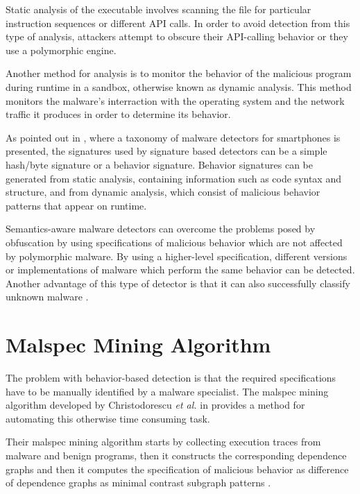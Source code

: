 Static analysis of the executable involves scanning the file for particular instruction sequences or different API calls. In order to avoid detection from this type of analysis, attackers attempt to obscure their API-calling behavior or they use a polymorphic engine.

Another method for analysis is to monitor the behavior of the malicious program during runtime in a sandbox, otherwise known as dynamic analysis. This method monitors the malware's interraction with the operating system and the network traffic it produces in order to determine its behavior.

As pointed out in \cite{smartphone-malware-detection}, where a taxonomy of malware detectors for smartphones is presented, the signatures used by signature based detectors can be a simple hash/byte signature or a behavior signature. Behavior signatures can be generated from static analysis, containing information such as code syntax and structure, and from dynamic analysis, which consist of malicious behavior patterns that appear on runtime.

Semantics-aware malware detectors can overcome the problems posed by obfuscation by using specifications of malicious behavior which are not affected by polymorphic malware. By using a higher-level specification, different versions or implementations of malware which perform the same behavior can be detected. Another advantage of this type of detector is that it can also successfully classify unknown malware \cite{semantics-based-detection}.

\section{Malspec Mining Algorithm}
\label{sec:malspec-alg}

The problem with behavior-based detection is that the required specifications have to be manually identified by a malware specialist. The malspec mining algorithm developed by Christodorescu \textit{et al.} in \cite{mining-specifications} provides a method for automating this otherwise time consuming task. 

Their malspec mining algorithm starts by collecting execution traces from malware and benign programs, then it constructs the corresponding dependence graphs and then it computes the specification of malicious behavior as difference of dependence graphs as minimal contrast subgraph patterns \cite{minimal-contrast-subgraph}.

